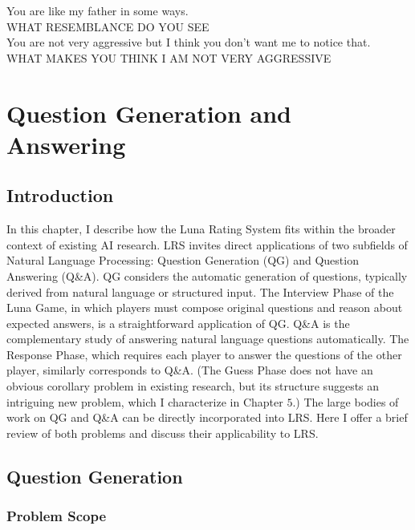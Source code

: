 \begin{savequote}[75mm]
You are like my father in some ways.\\
WHAT RESEMBLANCE DO YOU SEE\\
You are not very aggressive but I think you don't want me to notice that.\\
WHAT MAKES YOU THINK I AM NOT VERY AGGRESSIVE
\end{savequote}
\chapter{Question Generation and Answering}

\section{Introduction}

In this chapter, I describe how the Luna Rating System fits within the broader context of existing AI research. LRS invites direct applications of two subfields of Natural Language Processing: Question Generation (QG) and Question Answering (Q\&A). QG considers the automatic generation of questions, typically derived from natural language or structured input. The Interview Phase of the Luna Game, in which players must compose original questions and reason about expected answers, is a straightforward application of QG. Q\&A is the complementary study of answering natural language questions automatically. The Response Phase, which requires each player to answer the questions of the other player, similarly corresponds to Q\&A. (The Guess Phase does not have an obvious corollary problem in existing research, but its structure suggests an intriguing new problem, which I characterize in Chapter $5$.) The large bodies of work on QG and Q\&A can be directly incorporated into LRS. Here I offer a brief review of both problems and discuss their applicability to LRS. 

\section{Question Generation}

\subsection{Problem Scope}

